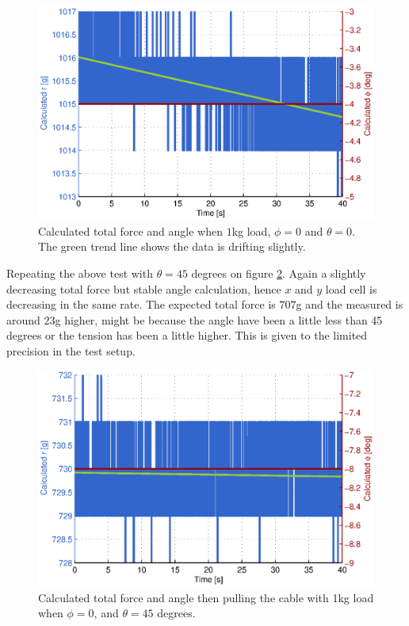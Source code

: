 \begin{figure}[hbtp]
\centering
\includegraphics[scale=1]{graphics/gcs_test/theta0phi0deg1kgCable.eps}
\caption[Total force and angle when $1$kg load, $\phi=0$ and $\theta=0$]{Calculated total force and angle when $1$kg load, $\phi=0$ and $\theta=0$. The green trend line shows the data is drifting slightly.}
\label{fig:theta0phi0deg1kgCable}
\end{figure}

\newpage
\noindent
Repeating the above test with $\theta=45$ degrees on figure \ref{fig:theta45phi0deg1kgCable}. Again a slightly decreasing total force but stable angle calculation, hence $x$ and $y$ load cell is decreasing in the same rate. The expected total force is $707$g and the measured is around $23$g higher, might be because the angle have been a little less than 45 degrees or the tension has been a little higher. This is given to the limited precision in the test setup.


\begin{figure}[hbtp]
\centering
\includegraphics[scale=1]{graphics/gcs_test/theta45phi0deg1kgCable.eps}
\caption[Calculated total force and angle, 1kg load, $\phi=0$, and $\theta=45$ degrees.]{Calculated total force and angle then pulling the cable with 1kg load when $\phi=0$, and $\theta=45$ degrees.}
\label{fig:theta45phi0deg1kgCable}
\end{figure}




